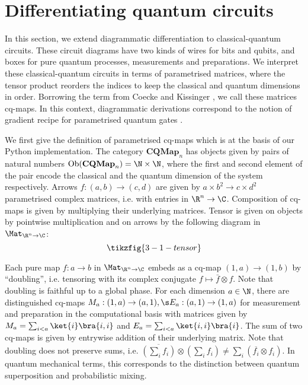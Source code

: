 
\section{Differentiating quantum circuits}\label{3-dual-circuits}

In this section, we extend diagrammatic differentiation to classical-quantum
circuits. These circuit diagrams have two kinds of wires for bits and qubits,
and boxes for pure quantum processes, measurements and preparations.
We interpret these classical-quantum circuits in terms of parametrised matrices,
where the tensor product reorders the indices to keep the classical and quantum
dimensions in order. Borrowing the term from Coecke and Kissinger
\cite{CoeckeKissinger17}, we call these matrices cq-maps.
In this context, diagrammatic derivations correspond to the notion of gradient
recipe for parametrised quantum gates \cite{SchuldEtAl19}.

We first give the definition of parametrised cq-maps which is at the basis
of our Python implementation.
The category $\mathbf{CQMap}_n$ has objects given by pairs of natural numbers
$\text{Ob}(\mathbf{CQMap}_n) = \N \times \N$, where the first and second element
of the pair encode the classical and the quantum dimension of the system respectively.
Arrows $f : (a, b) \to (c, d)$ are given by $a \times b^2 \to c \times d^2$
parametrised complex matrices, i.e. with entries in $\R^n \to \C$.
Composition of cq-maps is given by multiplying their underlying matrices.
Tensor is given on objects by pointwise multiplication and on arrows by the
following diagram in $\Mat_{\R^n \to \C}$:
$$\tikzfig{3-1-tensor}$$

Each pure map $f : a \to b$ in $\Mat_{\R^n \to \C}$ embeds as a
cq-map $(1, a) \to (1, b)$ by ``doubling'', i.e. tensoring with its complex
conjugate $f \mapsto \bar{f} \otimes f$.
Note that doubling is faithful up to a global phase.
For each dimension $a \in \N$, there are distinguished cq-maps
$M_a : (1, a) \to (a, 1), \s E_a : (a, 1) \to (1, a)$ for measurement and
preparation in the computational basis with matrices given by
$M_a = \sum_{i < a} \ket{i} \bra{i, i}$
and $E_a = \sum_{i < a} \ket{i, i} \bra{i}$.
The sum of two cq-maps is given by entrywise addition of their underlying
matrix. Note that doubling does not preserve sums,
i.e. $\overline{(\sum_i f_i)} \otimes (\sum_i f_i)
\neq \sum_i (\overline{f_i} \otimes f_i)$.
In quantum mechanical terms, this corresponds to the distinction between
quantum superposition and probabilistic mixing.

